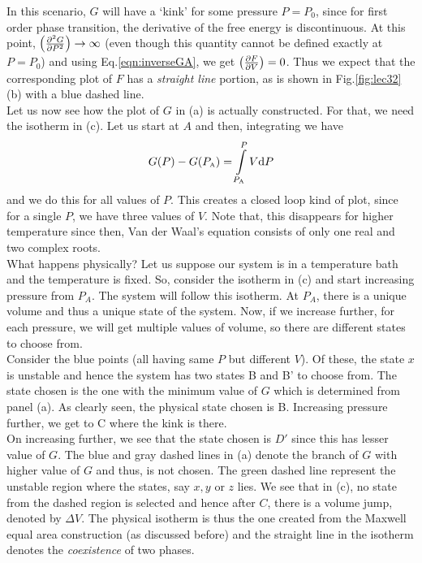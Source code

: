 \noindent
In this scenario, $G$ will have a `kink' for some pressure $P=P_0$, since for first order phase transition, the derivative of the free energy is discontinuous. At this point, $\qty(\pdv[2]{G}{P}) \to \infty$ (even though this quantity cannot be defined exactly at $P=P_0$) and using Eq.\eqref{eqn:inverseGA}, we get $\qty(\pdv{F}{V})=0$. Thus we expect that the corresponding plot of $F$ has a \textit{straight line} portion, as is shown in Fig.\ref{fig:lec32} (b) with a blue dashed line.\\[0.2cm]
Let us now see how the plot of $G$ in (a) is actually constructed. For that, we need the isotherm in (c). Let us start at $A$ and then, integrating we have $$G(P)-G(P_{\text{\tiny A}}) = \int\limits_{P_{\text{\tiny A}}}^{P}V\dd P$$ and we do this for all values of $P$. This creates a closed loop kind of plot, since for a single $P$, we have three values of $V$. Note that, this disappears for higher temperature since then, Van der Waal's equation consists of only one real and two complex roots. \\[0.2cm]
What happens physically? Let us suppose our system is in a temperature bath and the temperature is fixed. So, consider the isotherm in (c) and start increasing pressure from $P_A$. The system will follow this isotherm. At $P_A$, there is a unique volume and thus a unique state of the system. Now, if we increase further, for each pressure, we will get multiple values of volume, so there are different states to choose from.\\[0.2cm] Consider the blue points (all having same $P$ but different $V$). Of these, the state $x$ is unstable and hence the system has two states B and B' to choose from. The state chosen is the one with the minimum value of $G$ which is determined from panel (a). As clearly seen, the physical state chosen is B. Increasing pressure further, we get to C where the kink is there.\\[0.2cm] On increasing further, we see that the state chosen is $D'$ since this has lesser value of $G$. The blue and gray dashed lines in (a) denote the branch of $G$ with higher value of $G$ and thus, is not chosen. The green dashed line represent the unstable region where the states, say $x,y$ or $z$ lies. We see that in (c), no state from the dashed region is selected and hence after $C$, there is a volume jump, denoted by $\Delta V$. The physical isotherm is thus the one created from the Maxwell equal area construction (as discussed before) and the straight line in the isotherm denotes the \textit{coexistence} of two phases. \\[0.2cm]
